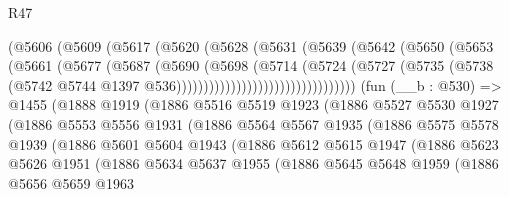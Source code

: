 \begin{lexlean}{R47}
\begin{coremodule}
                            (@5606
                              (@5609
                                (@5617
                                  (@5620
                                    (@5628
                                      (@5631
                                        (@5639
                                          (@5642
                                            (@5650
                                              (@5653
                                                (@5661
                                                  (@5677
                                                    (@5687
                                                      (@5690
                                                        (@5698
                                                          (@5714
                                                            (@5724
                                                              (@5727
                                                                (@5735
                                                                  (@5738
                                                                    (@5742
                                                                      @5744
                                                                      @1397
                                                                      @536)))))))))))))))))))))))))))))))))
    (fun (__b : @530) =>
    @1455
      (@1888
        @1919
        (@1886
          @5516
          @5519
          @1923
          (@1886
            @5527
            @5530
            @1927
            (@1886
              @5553
              @5556
              @1931
              (@1886
                @5564
                @5567
                @1935
                (@1886
                  @5575
                  @5578
                  @1939
                  (@1886
                    @5601
                    @5604
                    @1943
                    (@1886
                      @5612
                      @5615
                      @1947
                      (@1886
                        @5623
                        @5626
                        @1951
                        (@1886
                          @5634
                          @5637
                          @1955
                          (@1886
                            @5645
                            @5648
                            @1959
                            (@1886
                              @5656
                              @5659
                              @1963

\end{coremodule}
\end{lexlean}
